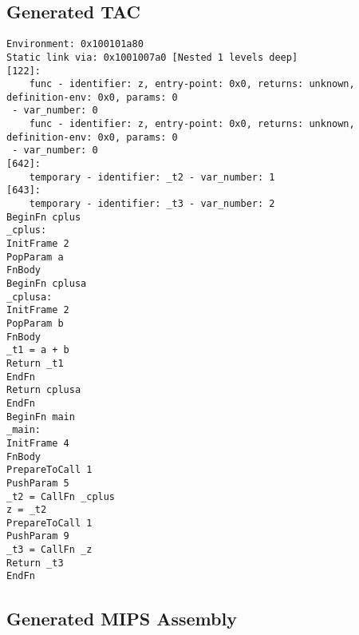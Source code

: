 \subsection{Generated TAC}
\begin{verbatim}
Environment: 0x100101a80
Static link via: 0x1001007a0 [Nested 1 levels deep]
[122]:
	func - identifier: z, entry-point: 0x0, returns: unknown, definition-env: 0x0, params: 0
 - var_number: 0
	func - identifier: z, entry-point: 0x0, returns: unknown, definition-env: 0x0, params: 0
 - var_number: 0
[642]:
	temporary - identifier: _t2 - var_number: 1
[643]:
	temporary - identifier: _t3 - var_number: 2
BeginFn cplus
_cplus:
InitFrame 2
PopParam a
FnBody
BeginFn cplusa
_cplusa:
InitFrame 2
PopParam b
FnBody
_t1 = a + b
Return _t1
EndFn
Return cplusa
EndFn
BeginFn main
_main:
InitFrame 4
FnBody
PrepareToCall 1
PushParam 5
_t2 = CallFn _cplus
z = _t2
PrepareToCall 1
PushParam 9
_t3 = CallFn _z
Return _t3
EndFn
\end{verbatim}\subsection{Generated MIPS Assembly}
